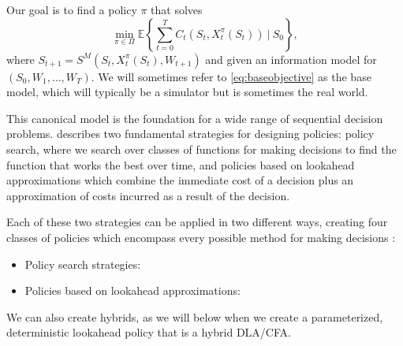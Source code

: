 \documentclass[11pt,oneside,fleqn,reqno,titlepage]{article}
\newcommand{\E}{\mathbb{E}}
\begin{document}
Our goal is to find a policy $\pi$ that solves
\begin{equation}
	\min_{\pi \in \Pi}  \E \left\{ \sum^T_{t=0} C_t(S_t, X^{\pi}_t(S_t)) \: \bigg| \: S_0  \right\}, \label{eq:baseobjective}
\end{equation}
where $S_{t+1} = S^M(S_t,X^\pi_t(S_t),W_{t+1})$ and given an information model for $(S_0, W_1, \ldots, W_T)$.  We will sometimes refer to \eqref{eq:baseobjective} as the base model, which will typically be a simulator but is sometimes the real world.

This canonical model is the foundation for a wide range of sequential decision problems.  \cite{Powell2019} describes two fundamental strategies for designing policies: policy search, where we search over classes of functions for making decisions to find the function that works the best over time, and policies based on lookahead approximations which combine the immediate cost of a decision plus an approximation of costs incurred as a result of the decision.

Each of these two strategies can be applied in two different ways, creating four classes of policies which encompass every possible method for making decisions \citep{Powell2019}:
\begin{itemize}
    \item Policy search strategies:
    \item Policies based on lookahead approximations:
\end{itemize}
We can also create hybrids, as we will below when we create a parameterized, deterministic lookahead policy that is a hybrid DLA/CFA.
\end{document}
